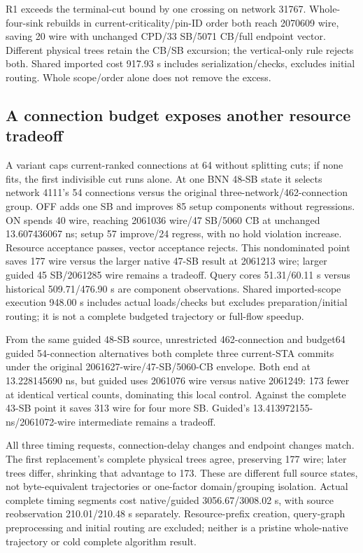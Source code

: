 \documentclass[conference,10pt]{IEEEtran}
\begin{document}
R1 exceeds the terminal-cut bound by one crossing on network 31767. Whole-four-sink rebuilds in current-criticality/pin-ID order both reach 2070609 wire, saving 20 wire with unchanged CPD/33 SB/5071 CB/full endpoint vector. Different physical trees retain the CB/SB excursion; the vertical-only rule rejects both. Shared imported cost 917.93 s includes serialization/checks, excludes initial routing. Whole scope/order alone does not remove the excess.

\subsection{A connection budget exposes another resource tradeoff}
A variant caps current-ranked connections at 64 without splitting cuts; if none fits, the first indivisible cut runs alone. At one BNN 48-SB state it selects network 4111's 54 connections versus the original three-network/462-connection group. OFF adds one SB and improves 85 setup components without regressions. ON spends 40 wire, reaching 2061036 wire/47 SB/5060 CB at unchanged 13.607436067 ns; setup 57 improve/24 regress, with no hold violation increase. Resource acceptance passes, vector acceptance rejects. This nondominated point saves 177 wire versus the larger native 47-SB result at 2061213 wire; larger guided 45 SB/2061285 wire remains a tradeoff. Query cores 51.31/60.11 s versus historical 509.71/476.90 s are component observations. Shared imported-scope execution 948.00 s includes actual loads/checks but excludes preparation/initial routing; it is not a complete budgeted trajectory or full-flow speedup.

From the same guided 48-SB source, unrestricted 462-connection and budget64 guided 54-connection alternatives both complete three current-STA commits under the original 2061627-wire/47-SB/5060-CB envelope. Both end at 13.228145690 ns, but guided uses 2061076 wire versus native 2061249: 173 fewer at identical vertical counts, dominating this local control. Against the complete 43-SB point it saves 313 wire for four more SB. Guided's 13.413972155-ns/2061072-wire intermediate remains a tradeoff.

All three timing requests, connection-delay changes and endpoint changes match. The first replacement's complete physical trees agree, preserving 177 wire; later trees differ, shrinking that advantage to 173. These are different full source states, not byte-equivalent trajectories or one-factor domain/grouping isolation. Actual complete timing segments cost native/guided 3056.67/3008.02 s, with source reobservation 210.01/210.48 s separately. Resource-prefix creation, query-graph preprocessing and initial routing are excluded; neither is a pristine whole-native trajectory or cold complete algorithm result.
\end{document}
